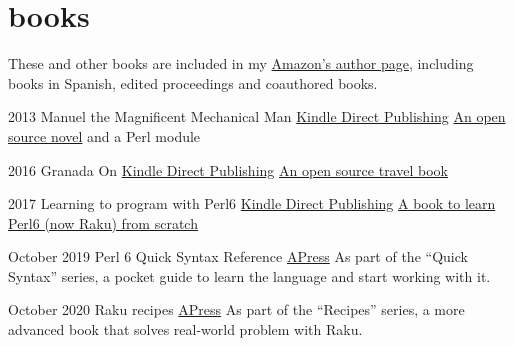 \documentclass[]{friggeri-jj-cv}
\begin{document}
\newpage

\section{books}

These and other books are included in my
\href{https://amazon.com/author/jjmerelo}{Amazon's author page},
including books in Spanish, edited proceedings and coauthored books.

\begin{entrylist}
  \entry
    {2013}
    {Manuel the Magnificent Mechanical Man}
    {\href{http://www.amazon.com/dp/B00ED084BK/}{Kindle Direct Publishing}}
    {\href{http://jj.github.io/hoborg}{An open source novel} and a
      Perl module}

  \entry
    {2016}
    {Granada On}
    {\href{https://www.amazon.com/Granada-Beaten-Track-explorations-Andalusia/dp/1523257083}{Kindle Direct Publishing}}
    {\href{http://github.com/JJ/granada-off}{An open source travel book}}

  \entry
    {2017}
    {Learning to program with Perl6}
    {\href{https://www.amazon.com/Learning-program-Perl-Getting-programming/dp/1521795789/ref=sr_1_1?ie=UTF8&qid=1518685809&sr=8-1}{Kindle Direct Publishing}}
    {\href{http://github.com/JJ/perl6em}{A book to learn Perl6 (now
        Raku) from scratch}}

    \entry
    {October 2019}
    {Perl 6 Quick Syntax Reference}
    {\href{https://www.apress.com/gp/book/9781484249550}{APress}}
    {As part of the ``Quick Syntax'' series, a pocket guide to learn
      the language and start working with it. }

  \entry
    {October 2020}
    {Raku recipes}
    {\href{https://www.apress.com/gp/book/9781484262573}{APress}}
    {As part of the ``Recipes'' series, a more advanced book that
      solves real-world problem with Raku. }

  \end{entrylist}
\end{document}
